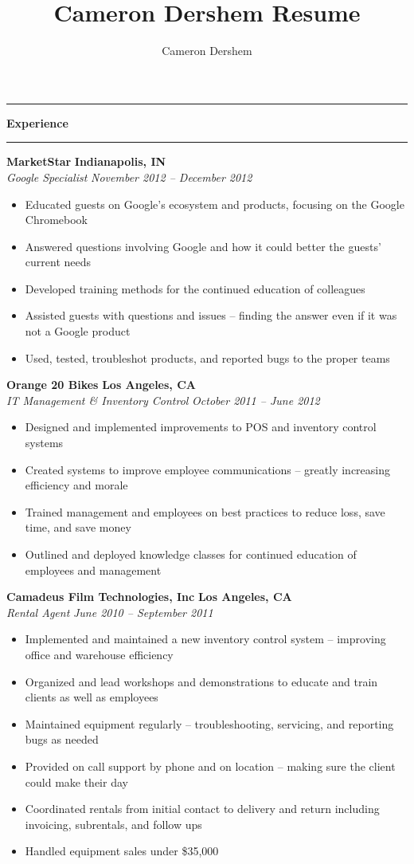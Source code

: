 \documentclass[10pt,letterpaper]{article}			%
\author{Cameron Dershem}							%
\title{Cameron Dershem Resume}						%
\newcommand{
    \JobHeader}[4]{
	\textbf{#1}
	\hfill
	\textbf{#2}
	\\
	\emph{#3}
	\hfill
	\emph{#4}
	}
\newcommand{
    \sectionHeader}[1]{
    \hrule
    \vspace{0.2em}
    {\large \textbf {#1}}
    \vspace{0.2em}
    \hrule
    \vspace{0.2em}
    }
\begin{document}

\sectionHeader{Experience}

	\JobHeader{MarketStar}{Indianapolis, IN}{Google Specialist}{November 2012 -- December 2012}
		\begin{itemize}
            \item Educated guests on Google's ecosystem and products, focusing on the Google Chromebook
		    \item Answered questions involving Google and how it could better the guests' current needs
            \item Developed training methods for the continued education of colleagues
            \item Assisted guests with questions and issues -- finding the answer even if it was not a Google product
		    \item Used, tested, troubleshot products, and reported bugs to the proper teams
		\end{itemize}

	\JobHeader{Orange 20 Bikes}{Los Angeles, CA}{IT Management \& Inventory Control}{October 2011 -- June 2012}
		\begin{itemize}	
		    \item Designed and implemented improvements to POS and inventory control systems
		    \item Created systems to improve employee communications -- greatly increasing efficiency and morale
		    \item Trained management and employees on best practices to reduce loss, save time, and save money
		    \item Outlined and deployed knowledge classes for continued education of employees and management
		\end{itemize}

	\JobHeader{Camadeus Film Technologies, Inc}{Los Angeles, CA}{Rental Agent}{June 2010 -- September 2011}
		\begin{itemize}
		    \item Implemented and maintained a new inventory control system -- improving office and warehouse efficiency
            \item Organized and lead workshops and demonstrations to educate and train clients as well as employees
		    \item Maintained equipment regularly -- troubleshooting, servicing, and reporting bugs as needed
		    \item Provided on call support by phone and on location -- making sure the client could make their day 
		    \item Coordinated rentals from initial contact to delivery and return including invoicing, subrentals, and follow ups
		    \item Handled equipment sales under \$35,000
		\end{itemize}
\end{document}
